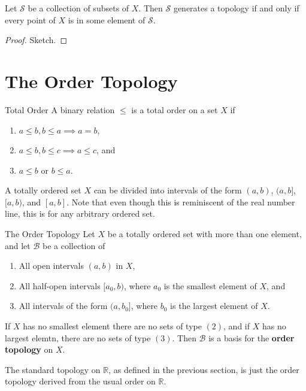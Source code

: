 \documentclass[10pt]{report}
\begin{document}
\begin{prop}
Let $\mathcal{S}$ be a collection of subsets of $X$. Then $\mathcal{S}$ generates a topology if and only if every point of $X$ is in some element of $\mathcal{S}$.
\end{prop}
\begin{proof}
{\color{red}Sketch.}
\end{proof}



\section{The Order Topology}

\begin{defn}{Total Order}{}
A binary relation $\leq$ is a total order on a set $X$ if
 \begin{enumerate}
	\item $a \leq b, b \leq a \implies a=b$,
	\item $a\leq b, b\leq c \implies a \leq c$, and
	\item $a \leq b$ or $b \leq a$.
\end{enumerate}
\end{defn}

A totally ordered set $X$ can be divided into intervals of the form $(a,b)$, $(a,b]$, $[a,b)$, and $[a,b]$. Note that even though this is reminiscent of the real number line, this is for any arbitrary ordered set.

\begin{defn}{The Order Topology}{}
Let $X$ be a totally ordered set with more than one element, and let $\mathcal{B}$ be a collection of
\begin{enumerate}
	\item All open intervals $(a,b)$ in $X$,
	\item All half-open intervals $[a_0,b)$, where $a_0$ is the smallest element of $X$, and
	\item All intervals of the form $(a,b_0]$, where $b_0$ is the largest element of $X$.
\end{enumerate}
If $X$ has no smallest element there are no sets of type $(2)$, and if $X$ has no largest elemtn, there are no sets of type $(3)$. Then $\mathcal{B}$ is a basis for the \textbf{order topology} on $X$.
\end{defn}

\begin{ex}{}{}
The standard topology on $\mathbb{R}$, as defined in the previous section, is just the order topology derived from the usual order on $\mathbb{R}$.
\end{ex}
\end{document}
